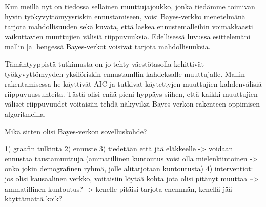 Kun meillä nyt on tiedossa sellainen muuttujajoukko, jonka tiedämme toimivan hyvin työkyvyttömyysriskin ennustamiseen, voisi Bayes-verkko menetelmänä tarjota mahdollisuuden sekä kuvata, että laskea ennustemalleihin voimakkaasti vaikuttavien muuttujien välisiä riippuvuuksia. Edellisessä luvussa esittelemäni mallin \ref{a} hengessä Bayes-verkot voisivat tarjota mahdollisuuksia.

Tämäntyyppistä tutkimusta on jo tehty väestötasolla \citet{airaksinen_development_2017} kehittivät työkyvyttömyyden yksilöriskin ennustamllin kahdeksalle muuttujalle. Mallin rakentamisessa he käyttivät AIC ja tutkivat käytettyjen muuttujien kahdenvälisiä riippuvuussuhteita. Tästä olisi enää pieni hyppäys siihen, että kaikki muuttujien väliset riippuvuudet voitaisiin tehdä näkyviksi Bayes-verkon rakenteen oppimisen algoritmeilla.

Mikä sitten olisi Bayes-verkon sovelluskohde?

1) graafin tulkinta
2) ennuste
3) tiedetään että jää eläkkeelle -> voidaan ennustaa taustamuuttuja (ammatillinen kuntoutus voisi olla mielenkiintoinen -> onko jokin demografinen ryhmä, jolle alitarjotaan kuntoutusta)
4) interventiot: jos olisi kausaalinen verkko, voitaisiin löytää kohta jota olisi pitänyt muuttaa --> ammatillinen kuntoutus? -> kenelle pitäisi tarjota enemmän, kenellä jää käyttämättä koik?
